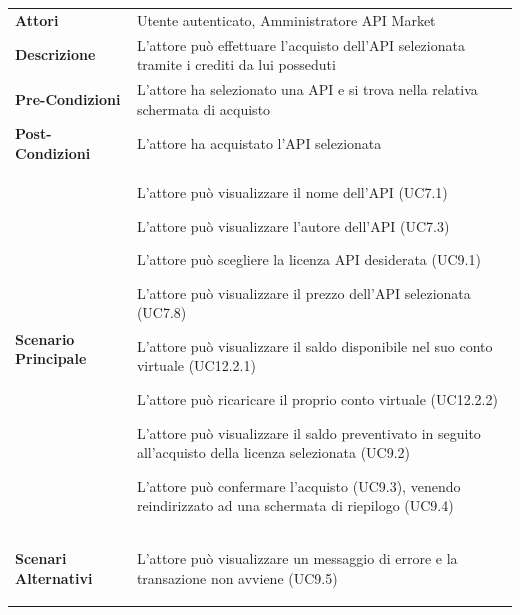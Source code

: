 \begin{longtable}{ l | p{11cm}}
	\hline
	\rowcolor{Gray}
	\multicolumn{2}{c}{UC9 - Acquisto API}\\
	\hline
	\textbf{Attori} & Utente autenticato, Amministratore API Market \\
	\textbf{Descrizione} & L'attore può effettuare l'acquisto dell'API selezionata tramite i crediti da lui posseduti \\
	\textbf{Pre-Condizioni} & L'attore ha selezionato una API e si trova nella relativa schermata di acquisto \\
	\textbf{Post-Condizioni} & L'attore ha acquistato l'API selezionata \\
	\textbf{Scenario Principale} & 
	\begin{enumerate*}[label=(\arabic*.),itemjoin={\newline}]
		\item L'attore può visualizzare il nome dell'API (UC7.1)
		\item L'attore può visualizzare l'autore dell'API (UC7.3)
		\item L'attore può scegliere la licenza API desiderata (UC9.1)
		\item L'attore può visualizzare il prezzo dell'API selezionata (UC7.8)
		\item L'attore può visualizzare il saldo disponibile nel suo conto virtuale (UC12.2.1)
		\item L'attore può ricaricare il proprio conto virtuale (UC12.2.2)
		\item L'attore può visualizzare il saldo preventivato in seguito all'acquisto della licenza selezionata (UC9.2)
		\item L'attore può confermare l'acquisto (UC9.3), venendo reindirizzato ad una schermata di riepilogo (UC9.4)
	\end{enumerate*}\\
	\textbf{Scenari Alternativi} & 
	\begin{enumerate*}[label=(\arabic*.),itemjoin={\newline}]
		\item L'attore può visualizzare un messaggio di errore e la transazione non avviene (UC9.5)
	\end{enumerate*}\\
\end{longtable}

\newpage
